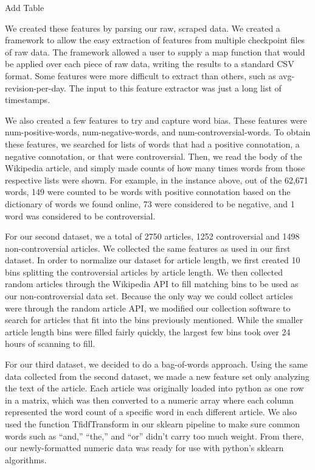 \documentclass{article}
\begin{document}
Add Table

We created these features by parsing our raw, scraped data. 
We created a framework to allow the easy extraction of features from multiple checkpoint files of raw data. 
The framework allowed a user to supply a map function that would be applied over each piece of raw data, writing the results to a standard CSV format. 
Some features were more difficult to extract than others, such as avg-revision-per-day. 
The input to this feature extractor was just a long list of timestamps.

We also created a few features to try and capture word bias. 
These features were num-positive-words, num-negative-words, and num-controversial-words. 
To obtain these features, we searched for lists of words that had a positive connotation, a negative connotation, or that were controversial. 
Then, we read the body of the Wikipedia article, and simply made counts of how many times words from those respective lists were shown. 
For example, in the instance above, out of the 62,671 words, 149 were counted to be words with positive connotation based on the dictionary of words we found online, 73 were considered to be negative, and 1 word was considered to be controversial. 

For our second dataset, we a total of 2750 articles, 1252 controversial and 1498 non-controversial articles. 
We collected the same features as used in our first dataset. 
In order to normalize our dataset for article length, we first created 10 bins splitting the controversial articles by article length. 
We then collected random articles through the Wikipedia API to fill matching bins to be used as our non-controversial data set. 
Because the only way we could collect articles were through the random article API, we modified our collection software to search for articles that fit into the bins previously mentioned. 
While the smaller article length bins were filled fairly quickly, the largest few bins took over 24 hours of scanning to fill. 


For our third dataset, we decided to do a bag-of-words approach. 
Using the same data collected from the second dataset, we made a new feature set only analyzing the text of the article. 
Each article was originally loaded into python as one row in a matrix, which was then converted to a numeric array where each column represented the word count of a specific word in each different article. 
We also used the function TfidfTransform in our sklearn pipeline to make sure common words such as “and,” “the,” and “or” didn’t carry too much weight. 
From there, our newly-formatted numeric data was ready for use with python’s sklearn algorithms.
\end{document}
